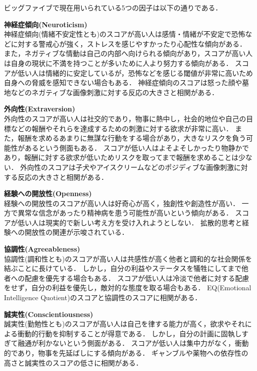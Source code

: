 ビッグファイブで現在用いられている5つの因子は以下の通りである\cite{daniel}．
\begin{description}
    \item{\textbf{神経症傾向(Neuroticism)}}\mbox{}\\
    神経症傾向(情緒不安定性とも)のスコアが高い人は感情・情緒が不安定で恐怖などに対する警戒心が強く，ストレスを感じやすかったり心配性な傾向がある．
    また，ネガティブな情動は自己の内部へ向けられる傾向があり，スコアが高い人は自身の現状に不満を持つことが多いために人より努力する傾向がある．
    スコアが低い人は情緒的に安定しているが，恐怖などを感じる閾値が非常に高いため自身への脅威を感知できない場合もある．
    神経症傾向のスコアは怒った顔や墓地などのネガティブな画像刺激に対する反応の大きさと相関がある．
    \item{\textbf{外向性(Extraversion)}}\mbox{}\\
    外向性のスコアが高い人は社交的であり，物事に熱中し，社会的地位や自己の目標などの報酬やそれらを達成するための刺激に対する欲求が非常に高い．
    また，報酬を求めるあまりに無謀な行動をする場合があり，大きなリスクを負う可能性があるという側面もある．
    スコアが低い人はよそよそしかったり物静かであり，報酬に対する欲求が低いためリスクを取ってまで報酬を求めることは少ない．
    外向性のスコアは子犬やアイスクリームなどのポジディブな画像刺激に対する反応の大きさと相関がある．
    \item{\textbf{経験への開放性(Openness)}}\mbox{}\\
    経験への開放性のスコアが高い人は好奇心が高く，独創性や創造性が高い．
    一方で異常な信念があったり精神病を患う可能性が高いという傾向がある．
    スコアが低い人は現実的で新しい考え方を受け入れようとしない．
    拡散的思考と経験への開放性の関連が示唆されている．
    \item{\textbf{協調性(Agreeableness)}}\mbox{}\\
    協調性(調和性とも)のスコアが高い人は共感性が高く他者と調和的な社会関係を結ぶことに長けている．
    しかし，自分の利益やステータスを犠牲にしてまで他者への配慮を優先する場合もある．
    スコアが低い人は冷淡で他者に対する配慮をせず，自分の利益を優先し，敵対的な態度を取る場合もある．
    EQ(Emotional Intelligence Quotient)のスコアと協調性のスコアに相関がある．
    \item{\textbf{誠実性(Conscientiousness)}}\mbox{}\\
    誠実性(勤勉性とも)のスコアが高い人は自己を律する能力が高く，欲求やそれによる衝動的行動を抑制することが得意である．
    しかし，自分の計画に固執しすぎて融通が利かないという側面がある．
    スコアが低い人は集中力がなく，衝動的であり，物事を先延ばしにする傾向がある．
    ギャンブルや薬物への依存性の高さと誠実性のスコアの低さに相関がある．
\end{description}

